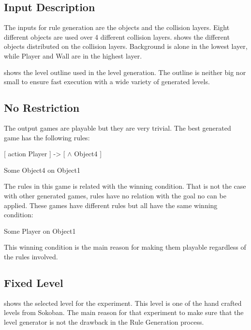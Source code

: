 \subsection{Input Description}
The inputs for rule generation are the objects and the collision layers. Eight different objects are used over 4 different collision layers.  shows the different objects distributed on the collision layers. Background is alone in the lowest layer, while Player and Wall are in the highest layer.


 shows the level outline used in the level generation. The outline is neither big nor small to ensure fast execution with a wide variety of generated levels.


\subsection{No Restriction}
The output games are playable but they are very trivial. The best generated game has the following rules:
\begin{center}
[ action Player ] -> [ $\wedge$ Object4 ]
\end{center}
\begin{center}
Some Object4 on Object1
\end{center}
The rules in this game is related with the winning condition. That is not the case with other generated games, rules have no relation with the goal no can be applied. These games have different rules but all have the same winning condition:
\begin{center}
Some Player on Object1
\end{center}
This winning condition is the main reason for making them playable regardless of the rules involved.

\subsection{Fixed Level}
 shows the selected level for the experiment. This level is one of the hand crafted levels from Sokoban. The main reason for that experiment to make sure that the level generator is not the drawback in the Rule Generation process.\\\par

